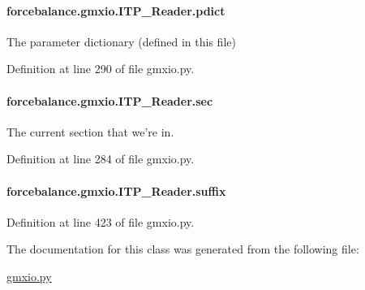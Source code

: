 \hypertarget{classforcebalance_1_1gmxio_1_1ITP__Reader_a1c74f6a71b392ecbf20ccc1e12b0d321}{
\paragraph[{pdict}]{\setlength{\rightskip}{0pt plus 5cm}forcebalance.\-gmxio.\-I\-T\-P\-\_\-\-Reader.\-pdict}}\label{classforcebalance_1_1gmxio_1_1ITP__Reader_a1c74f6a71b392ecbf20ccc1e12b0d321}


The parameter dictionary (defined in this file) 



Definition at line 290 of file gmxio.\-py.

\hypertarget{classforcebalance_1_1gmxio_1_1ITP__Reader_a744b1698c9ccfc1be470d83862099551}{
\paragraph[{sec}]{\setlength{\rightskip}{0pt plus 5cm}forcebalance.\-gmxio.\-I\-T\-P\-\_\-\-Reader.\-sec}}\label{classforcebalance_1_1gmxio_1_1ITP__Reader_a744b1698c9ccfc1be470d83862099551}


The current section that we're in. 



Definition at line 284 of file gmxio.\-py.

\hypertarget{classforcebalance_1_1gmxio_1_1ITP__Reader_a147438dd2683af88b92b659c96162848}{
\paragraph[{suffix}]{\setlength{\rightskip}{0pt plus 5cm}forcebalance.\-gmxio.\-I\-T\-P\-\_\-\-Reader.\-suffix}}\label{classforcebalance_1_1gmxio_1_1ITP__Reader_a147438dd2683af88b92b659c96162848}


Definition at line 423 of file gmxio.\-py.



The documentation for this class was generated from the following file\-:\begin{DoxyCompactItemize}
\item 
\hyperlink{gmxio_8py}{gmxio.\-py}\end{DoxyCompactItemize}
